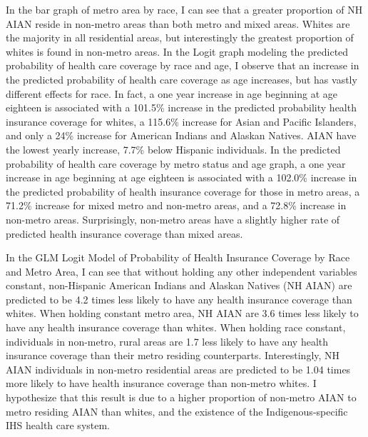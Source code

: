 \documentclass[11pt,]{article}
\begin{document}
In the bar graph of metro area by race, I can see that a greater
proportion of NH AIAN reside in non-metro areas than both metro and
mixed areas. Whites are the majority in all residential areas, but
interestingly the greatest proportion of whites is found in non-metro
areas. In the Logit graph modeling the predicted probability of health
care coverage by race and age, I observe that an increase in the
predicted probability of health care coverage as age increases, but has
vastly different effects for race. In fact, a one year increase in age
beginning at age eighteen is associated with a 101.5\% increase in the
predicted probability health insurance coverage for whites, a 115.6\%
increase for Asian and Pacific Islanders, and only a 24\% increase for
American Indians and Alaskan Natives. AIAN have the lowest yearly
increase, 7.7\% below Hispanic individuals. In the predicted probability
of health care coverage by metro status and age graph, a one year
increase in age beginning at age eighteen is associated with a 102.0\%
increase in the predicted probability of health insurance coverage for
those in metro areas, a 71.2\% increase for mixed metro and non-metro
areas, and a 72.8\% increase in non-metro areas. Surprisingly, non-metro
areas have a slightly higher rate of predicted health insurance coverage
than mixed areas.

In the GLM Logit Model of Probability of Health Insurance Coverage by
Race and Metro Area, I can see that without holding any other
independent variables constant, non-Hispanic American Indians and
Alaskan Natives (NH AIAN) are predicted to be 4.2 times less likely to
have any health insurance coverage than whites. When holding constant
metro area, NH AIAN are 3.6 times less likely to have any health
insurance coverage than whites. When holding race constant, individuals
in non-metro, rural areas are 1.7 less likely to have any health
insurance coverage than their metro residing counterparts.
Interestingly, NH AIAN individuals in non-metro residential areas are
predicted to be 1.04 times more likely to have health insurance coverage
than non-metro whites. I hypothesize that this result is due to a higher
proportion of non-metro AIAN to metro residing AIAN than whites, and the
existence of the Indigenous-specific IHS health care system.
\end{document}

